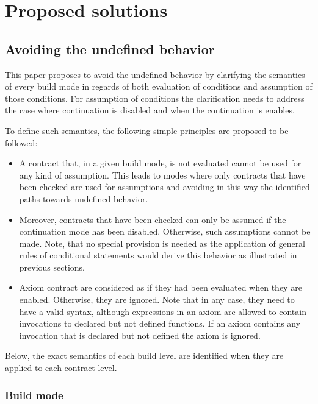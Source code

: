 \section{Proposed solutions}
\label{sec:proposed}

\subsection{Avoiding the undefined behavior}

This paper proposes to avoid the undefined behavior by clarifying the semantics of every
build mode in regards of both evaluation of conditions and assumption of those
conditions. For assumption of conditions the clarification needs to address the
case where continuation is disabled and when the continuation is enables.

To define such semantics, the following simple principles are proposed to be followed:

\begin{itemize}

\item A contract that, in a given build mode, is not evaluated cannot be used
for any kind of assumption. This leads to modes where only contracts that have
been checked are used for assumptions and avoiding in this way the identified
paths towards undefined behavior.

\item Moreover, contracts that have been checked can only be assumed if the
continuation mode has been disabled. Otherwise, such assumptions cannot be made.
Note, that no special provision is needed as the application of general rules
of conditional statements would derive this behavior as illustrated in previous
sections.

\item Axiom contract are considered as if they had been evaluated when they are
	enabled. Otherwise, they are ignored.  Note that in any case, they need
		to have a valid syntax, although expressions in an axiom are
		allowed to contain invocations to declared but not defined
		functions. If an axiom contains any invocation that is declared
		but not defined the axiom is ignored.

\end{itemize}

Below, the exact semantics of each build level are identified when 
they are applied
to each contract level.

\subsubsection{Build mode}

